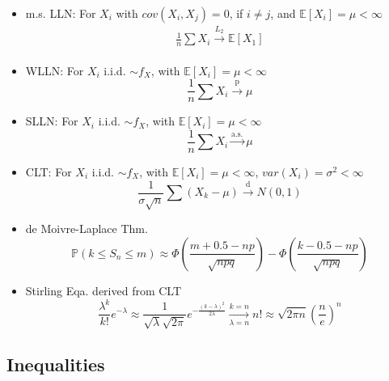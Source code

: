 \begin{itemize}
\item m.s. LLN: For $ X_i $ with $ cov(X_i,X_j)=0$, if $ i\neq j $, and $ \mathbb{E}\left[ X_i \right] =\mu <\infty $
\begin{align}
    \frac{1}{n}\sum X_i\xrightarrow[]{L_2} \mathbb{E}\left[ X_1 \right]
\end{align}


\item WLLN: For $ X_i $ i.i.d. $ \sim f_X $, with $ \mathbb{E}\left[ X_i \right]=\mu <\infty $
\begin{equation}    \frac{1}{n}\sum X_i\xrightarrow[]{\mathrm{p}}\mu 
\end{equation}
\item SLLN: For $ X_i $ i.i.d. $ \sim f_X $, with $ \mathbb{E}\left[ X_i \right] =\mu <\infty $
\begin{equation}    \frac{1}{n}\sum X_i\xrightarrow[]{\text{a.s.}}  \mu 
\end{equation}
\item CLT: For $ X_i $ i.i.d. $ \sim f_X $, with $ \mathbb{E}\left[ X_i \right] =\mu <\infty $, $ var(X_i)=\sigma ^2<\infty $
\begin{equation}    \frac{1}{\sigma\sqrt{n}}\sum(X_k-\mu)\xrightarrow[]{\mathrm{d}} N(0,1)
\end{equation}
\item de Moivre-Laplace Thm.
\begin{equation}    \mathbb{P}(k\leq S_n\leq m)\approx \Phi(\frac{m+0.5-np}{\sqrt{npq}})-\Phi(\frac{k-0.5-np}{\sqrt{npq}})
\end{equation}
\item Stirling Eqa. derived from CLT
\begin{equation}    \frac{\lambda^k}{k!}e^{-\lambda}\approx \frac{1}{\sqrt{\lambda}\sqrt{2\pi}}e^{-\frac{(k-\lambda)^2}{2\lambda}}\xrightarrow[\lambda=n]{k=n}n!\approx\sqrt{2\pi n}(\frac{n}{e})^n
\end{equation}

\end{itemize}


\subsection{Inequalities}
    
